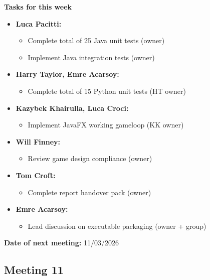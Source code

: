 \documentclass[11pt]{article}
\begin{document}
    \textbf{Tasks for this week}
    \begin{itemize}
        \item \textbf{Luca Pacitti:}
        \begin{itemize}
            \item Complete total of 25 Java unit tests (owner)
            \item Implement Java integration tests (owner)
        \end{itemize}

        \item \textbf{Harry Taylor, Emre Acarsoy:}
        \begin{itemize}
            \item Complete total of 15 Python unit tests (HT owner)
        \end{itemize}

        \item \textbf{Kazybek Khairulla, Luca Croci:}
        \begin{itemize}
            \item Implement JavaFX working gameloop (KK owner)
        \end{itemize}

        \item \textbf{Will Finney:}
        \begin{itemize}
            \item Review game design compliance (owner)
        \end{itemize}

        \item \textbf{Tom Croft:}
        \begin{itemize}
            \item Complete report handover pack (owner)
        \end{itemize}

        \item \textbf{Emre Acarsoy:}
        \begin{itemize}
            \item Lead discussion on executable packaging (owner + group)
        \end{itemize}
    \end{itemize}

    \textbf{Date of next meeting:} 11/03/2026

    \vspace{1.5\baselineskip}
    \subsection{Meeting 11}
\end{document}
